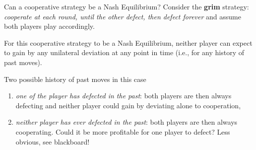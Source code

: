 \begin{frame}{Can a cooperative strategy be a Nash Equilibrium?}
    Consider the \textbf{grim} strategy: \textit{cooperate at each round, until the other defect,
    then defect forever} and assume both players play accordingly.

    For this cooperative strategy to be a Nash Equilibrium, neither player can expect to
    gain by any unilateral deviation at any point in time (i.e., for any history of past moves).
    
    Two possible history of past moves in this case
    \begin{enumerate}
        \pause
        \item \textit{one of the player has defected in the past}: both players are then always defecting
        and neither player could gain by deviating alone to cooperation, \pause
        \item \textit{neither player has ever defected in the past}: both players are then always cooperating.
        Could it be more profitable for one player to defect? Less obvious, see blackboard!
    \end{enumerate}
\end{frame}
    


